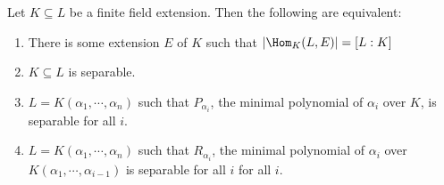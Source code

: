 \documentclass[a4paper]{article}
\begin{document}
\begin{thm}[]
  Let $K\subseteq L$ be a finite field extension. Then the following are equivalent:
  \begin{enumerate}
    \item There is some extension $E$ of $K$ such that $|\Hom_K(L, E)| = [L:K]$
    \item $K\subseteq L$ is separable.
    \item $L = K(\alpha_1, \cdots, \alpha_n)$ such that $P_{\alpha_i}$, the minimal polynomial of $\alpha_i$ over $K$, is separable for all $i$.
    \item $L = K(\alpha_1, \cdots, \alpha_n)$ such that $R_{\alpha_i}$, the minimal polynomial of $\alpha_i$ over $K(\alpha_1, \cdots, \alpha_{i - 1})$ is separable for all $i$ for all $i$.
  \end{enumerate}
\end{thm}
\end{document}

